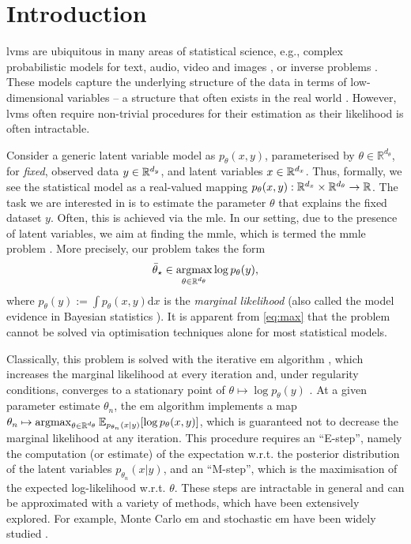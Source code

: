
\section{Introduction}\label{sec:intro}

\Glspl*{lvm} are ubiquitous in many areas of statistical science, e.g., complex probabilistic models for text, audio, video and images \citep{blei2003latent, smaragdis2006probabilistic, hoff2002latent}, or inverse problems \citep{glyn2024statistical}. These models capture the underlying structure of the data in terms of low-dimensional variables -- a structure that often exists in the real world \citep{whiteley2022statistical}. However, \glspl*{lvm} often require non-trivial procedures for their estimation as their likelihood is often intractable.

Consider a generic latent variable model as $p_\theta (x,y)$, parameterised by $\theta\in\mathbb{R}^{d_\theta}$, for \textit{fixed}, observed data $y \in {\mathbb R}^{d_y}$, and latent variables $x \in {\mathbb R}^{d_x}$. Thus, formally, we see the statistical model as a real-valued mapping $p_\theta(x,y) :\mathbb{R}^{d_x}\times \mathbb{R}^{d_\theta}\to {\mathbb R}$. The task we are interested in is to estimate the parameter $\theta$ that explains the fixed dataset $y$. Often, this is achieved via the \gls*{mle}. In our setting, due to the presence of latent variables, we aim at finding the \gls*{mmle}, which is termed the \gls*{mmle} problem \citep{dempster1977maximum}. More precisely, our problem takes the form
\begin{align}\label{eq:max}
\bar{\theta}_\star \in \argmax_{\theta\in\mathbb{R}^{d_\theta}} \log p_\theta(y),
\end{align}
where $p_\theta(y) := \int p_\theta(x,y) \mathrm{d}x$ is the \textit{marginal likelihood} (also called the model evidence in Bayesian statistics \citep{bernardo2009bayesian}). It is apparent from \eqref{eq:max} that the problem cannot be solved via optimisation techniques alone for most statistical models.

Classically, this problem is solved with the iterative \gls*{em} algorithm \citep{dempster1977maximum}, which increases the marginal likelihood at every iteration and, under regularity conditions, converges to a stationary point of $\theta \mapsto \log p_\theta(y)$ \citep{wu1983convergence}. At a given parameter estimate $\theta_n$, the \gls*{em} algorithm implements a map $\theta_n \mapsto \argmax_{\theta \in \mathbb{R}^{d_\theta}} \mathbb{E}_{p_{\theta_n} (x|y)}[\log p_{\theta} (x, y)]$, which is guaranteed not to decrease the marginal likelihood at any iteration. This procedure requires an ``E-step'', namely the computation (or estimate) of the expectation w.r.t. the posterior distribution of the latent variables $p_{\theta_n}(x|y)$, and an ``M-step'', which is the maximisation of the expected log-likelihood w.r.t. $\theta$. These steps are intractable in general and can be approximated with a variety of methods, which have been extensively explored. For example, Monte Carlo \gls*{em} \citep{wei1990monte} and stochastic \gls*{em} \citep{celeux1985sem} have been widely studied  \citep{celeux1992stochastic, chan1995monte, sherman1999conditions, booth1999maximizing, cappe1999simulation, diebolt1995stochastic}.

